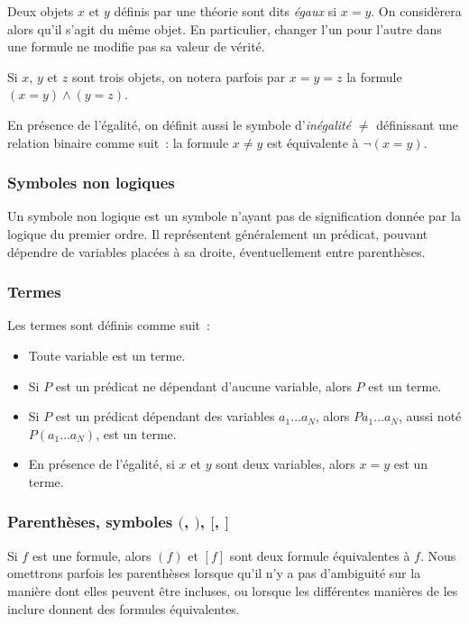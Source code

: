 Deux objets $x$ et $y$ définis par une théorie sont dits \textit{égaux} si $x = y$. 
On considèrera alors qu'il s'agit du même objet. 
En particulier, changer l'un pour l'autre dans une formule ne modifie pas sa valeur de vérité.

Si $x$, $y$ et $z$ sont trois objets, on notera parfois par $x = y = z$ la formule $(x = y) \wedge (y = z)$. 

En présence de l'égalité, on définit aussi le symbole d'\textit{inégalité} $\neq$ définissant une relation binaire comme suit : la formule $x \neq y$ est équivalente à $\neg (x = y)$.

\subsubsection{Symboles non logiques}

Un symbole non logique est un symbole n'ayant pas de signification donnée par la logique du premier ordre. 
Il représentent généralement un prédicat, pouvant dépendre de variables placées à sa droite, éventuellement entre parenthèses.

\subsubsection{Termes}

Les termes sont définis comme suit : 
\begin{itemize}
    \item Toute variable est un terme. 
    \item Si $P$ est un prédicat ne dépendant d'aucune variable, alors $P$ est un terme.
    \item Si $P$ est un prédicat dépendant des variables $a_1 \dots a_N$, alors $P a_1 \dots a_N$, aussi noté $P (a_1 \dots a_N)$, est un terme. 
    \item En présence de l'égalité, si $x$ et $y$ sont deux variables, alors $x = y$ est un terme.
\end{itemize}

\subsubsection{Parenthèses, symboles $($, $)$, $[$, $]$}

Si $f$ est une formule, alors $(f)$ et $[f]$ sont deux formule équivalentes à $f$. 
Nous omettrons parfois les parenthèses lorsque qu'il n'y a pas d'ambiguité sur la manière dont elles peuvent être incluses, ou lorsque les différentes manières de les inclure donnent des formules équivalentes. 

